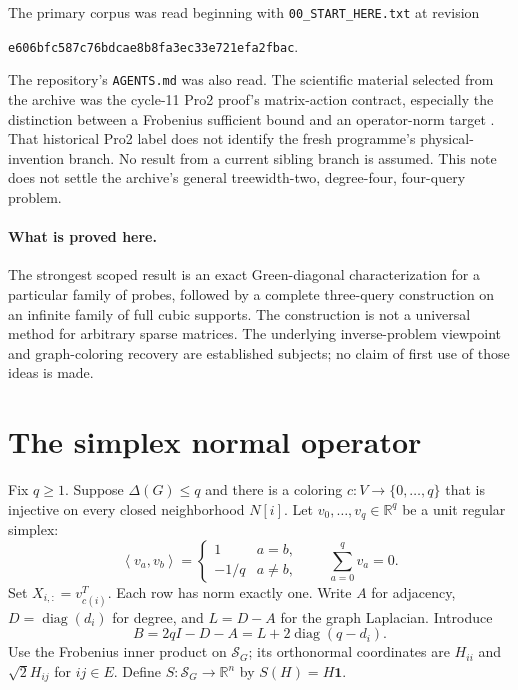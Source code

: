 \documentclass[11pt]{article}
\theoremstyle{remark}\newtheorem{remark}[theorem]{Remark}
\newcommand{\R}{\mathbb R}
\newcommand{\one}{\mathbf 1}
\newcommand{\SG}{\mathcal S_G}
\newcommand{\diag}{\operatorname{diag}}
\newcommand{\ip}[2]{\left\langle #1,#2\right\rangle}
\begin{document}
The primary corpus was read beginning with \texttt{00\_START\_HERE.txt} at revision
\begin{center}\small\texttt{e606bfc587c76bdcae8b8fa3ec33e721efa2fbac}.\end{center}
The repository's \texttt{AGENTS.md} was also read. The scientific material selected from the archive was the cycle-11 Pro2 proof's matrix-action contract, especially the distinction between a Frobenius sufficient bound and an operator-norm target \cite{corpus}. That historical Pro2 label does not identify the fresh programme's physical-invention branch. No result from a current sibling branch is assumed. This note does not settle the archive's general treewidth-two, degree-four, four-query problem.

\paragraph{What is proved here.}
The strongest scoped result is an exact Green-diagonal characterization for a particular family of probes, followed by a complete three-query construction on an infinite family of full cubic supports. The construction is not a universal method for arbitrary sparse matrices. The underlying inverse-problem viewpoint and graph-coloring recovery are established subjects; no claim of first use of those ideas is made.

\section{The simplex normal operator}

Fix $q\geq1$. Suppose $\Delta(G)\leq q$ and there is a coloring
$c:V\to\{0,\ldots,q\}$ that is injective on every closed neighborhood $N[i]$.
Let $v_0,\ldots,v_q\in\R^q$ be a unit regular simplex:
\[
\ip{v_a}{v_b}=\begin{cases}1&a=b,\\-1/q&a\ne b,\end{cases}
\qquad \sum_{a=0}^qv_a=0.
\]
Set $X_{i,:}=v_{c(i)}^T$. Each row has norm exactly one. Write $A$ for adjacency,
$D=\diag(d_i)$ for degree, and $L=D-A$ for the graph Laplacian. Introduce
\begin{equation}\label{eq:B}
B=2qI-D-A=L+2\diag(q-d_i).
\end{equation}
Use the Frobenius inner product on $\SG$; its orthonormal coordinates are $H_{ii}$ and $\sqrt2H_{ij}$ for $ij\in E$. Define $S:\SG\to\R^n$ by $S(H)=H\one$.
\end{document}
